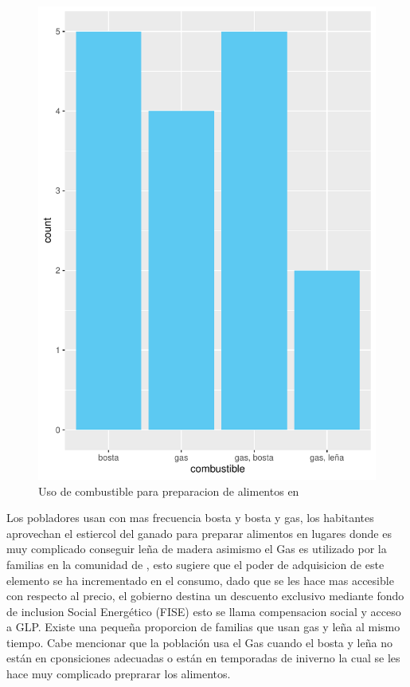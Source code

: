 \documentclass[12pt]{article}\usepackage[]{graphicx}\usepackage[]{xcolor}
\makeatletter
\def\maxwidth{ %
  \ifdim\Gin@nat@width>\linewidth
    \linewidth
  \else
    \Gin@nat@width
  \fi
}
\newenvironment{knitrout}{}{} %
\makeatother
\begin{document}
	\begin{figure}[H]
	\centering
\begin{knitrout}
\color{fgcolor}
\includegraphics[width=\maxwidth]{figure/ocho-1} 
\end{knitrout}
	\caption{Uso de combustible para preparacion de alimentos en \comunidad}
	\end{figure}
	Los pobladores usan con mas frecuencia bosta y bosta y gas, los habitantes aprovechan el estiercol del ganado para preparar alimentos en lugares donde es muy complicado conseguir leña de madera asimismo el Gas es utilizado por la familias en la comunidad de \comunidad, esto sugiere que el poder de adquisicion de este elemento se ha incrementado en el consumo, dado que se les hace mas accesible con respecto al precio, el gobierno destina un descuento exclusivo mediante fondo de inclusion Social Energético (FISE) esto se llama compensacion social y acceso a GLP. Existe una pequeña proporcion de familias que usan gas y leña al mismo tiempo. Cabe mencionar que la población usa el Gas cuando el bosta y leña no están en cponsiciones adecuadas o están en temporadas de iniverno la cual se les hace muy complicado preprarar los alimentos.\\
\end{document}
